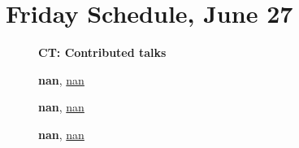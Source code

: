 \documentclass[ILAS2025-program.tex]{subfiles}
\begin{document}
\section*{Friday Schedule, June 27 }
        
        \begin{description}
    \item[] {\color{mstitle}\textbf{CT: Contributed talks}} 
    \item[] \hypertarget{up0425}{}\textbf{nan}, \hyperlink{down0425}{nan}
        \item[] \hypertarget{up0426}{}\textbf{nan}, \hyperlink{down0426}{nan}
        \item[] \hypertarget{up0427}{}\textbf{nan}, \hyperlink{down0427}{nan}
        \end{description}
    \newpage
\end{document}
